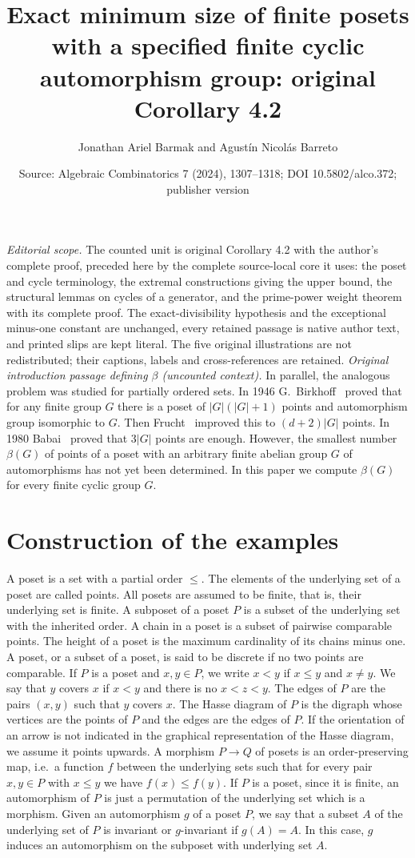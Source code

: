 \documentclass[10pt,a4paper]{amsart}
\title[Smallest posets with given cyclic automorphism group]{Exact minimum size of finite posets with a specified finite cyclic automorphism group: original Corollary 4.2}
\author{Jonathan Ariel Barmak and Agust\'in Nicol\'as Barreto}
\date{Source: Algebraic Combinatorics 7 (2024), 1307--1318; DOI 10.5802/alco.372; publisher version}
\newcommand{\ie}{i.e.\ }
\theoremstyle{plain}
\theoremstyle{definition}
\theoremstyle{remark}
\begin{document}
\maketitle
\noindent\textit{Editorial scope.} The counted unit is original Corollary 4.2 with the author's complete proof, preceded here by the complete source-local core it uses: the poset and cycle terminology, the extremal constructions giving the upper bound, the structural lemmas on cycles of a generator, and the prime-power weight theorem with its complete proof. The exact-divisibility hypothesis and the exceptional minus-one constant are unchanged, every retained passage is native author text, and printed slips are kept literal. The five original illustrations are not redistributed; their captions, labels and cross-references are retained.
\noindent\textit{Original introduction passage defining $\beta$ (uncounted context).}
In parallel, the analogous problem was studied for partially ordered sets. In 1946 G.~Birkhoff~\cite{Bir} proved that for any finite group $G$ there is a poset of $|G|(|G|+1)$ points and automorphism group isomorphic to $G$. Then Frucht~\cite{Fru50} improved this to $(d+2)|G|$ points. In 1980 Babai~\cite{Bab2} proved that $3|G|$ points are enough. However, the smallest number $\beta (G)$ of points of a poset with an arbitrary finite abelian group $G$ of automorphisms has not yet been determined. In this paper we compute $\beta (G)$ for every finite cyclic group $G$. 

\setcounter{section}{1}
\section{Construction of the examples} \label{sectionexamples}

A poset is a set with a partial order $\le$. The elements of the underlying set of a poset are called points. All posets are assumed to be finite, that is, their underlying set is finite. A subposet of a poset $P$ is a subset of the underlying set with the inherited order. A chain in a poset is a subset of pairwise comparable points. The height of a poset is the maximum cardinality of its chains minus one. A poset, or a subset of a poset, is said to be discrete if no two points are comparable. If $P$ is a poset and $x,y\in P$, we write $x<y$ if $x\le y$ and $x\neq y$. We say that $y$ covers $x$ if $x<y$ and there is no $x<z<y$. The edges of $P$ are the pairs $(x,y)$ such that $y$ covers $x$. The Hasse diagram of $P$ is the digraph whose vertices are the points of $P$ and the edges are the edges of $P$. If the orientation of an arrow is not indicated in the graphical representation of the Hasse diagram, we assume it points upwards. A morphism $P\to Q$ of posets is an order-preserving map, \ie a function $f$ between the underlying sets such that for every pair $x,y\in P$ with $x\le y$ we have $f(x)\le f(y)$. If $P$ is a poset, since it is finite, an automorphism of $P$ is just a permutation of the underlying set which is a morphism. Given an automorphism $g$ of a poset $P$, we say that a subset $A$ of the underlying set of $P$ is invariant or $g$-invariant if $g(A)=A$. In this case, $g$ induces an automorphism on the subposet with underlying set $A$.  
\end{document}
